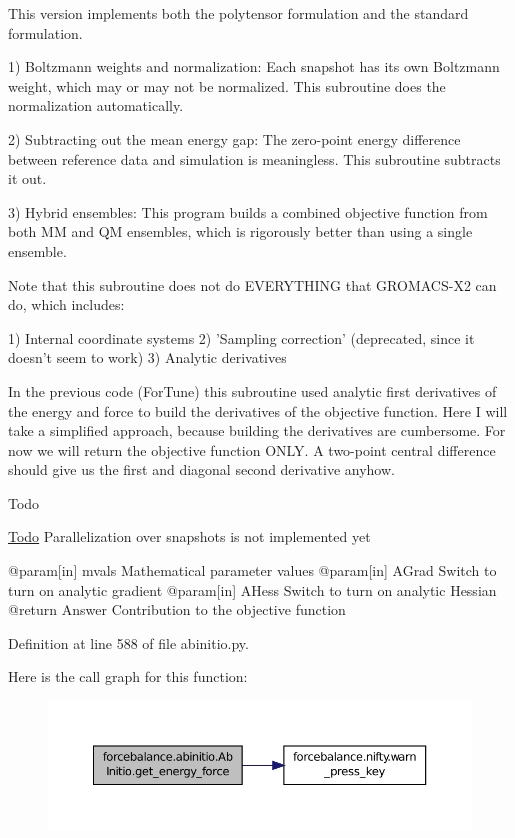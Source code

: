 This version implements both the polytensor formulation and the standard formulation.

1) Boltzmann weights and normalization\-: Each snapshot has its own Boltzmann weight, which may or may not be normalized. This subroutine does the normalization automatically.

2) Subtracting out the mean energy gap\-: The zero-\/point energy difference between reference data and simulation is meaningless. This subroutine subtracts it out.

3) Hybrid ensembles\-: This program builds a combined objective function from both M\-M and Q\-M ensembles, which is rigorously better than using a single ensemble.

Note that this subroutine does not do E\-V\-E\-R\-Y\-T\-H\-I\-N\-G that G\-R\-O\-M\-A\-C\-S-\/\-X2 can do, which includes\-:

1) Internal coordinate systems 2) 'Sampling correction' (deprecated, since it doesn't seem to work) 3) Analytic derivatives

In the previous code (For\-Tune) this subroutine used analytic first derivatives of the energy and force to build the derivatives of the objective function. Here I will take a simplified approach, because building the derivatives are cumbersome. For now we will return the objective function O\-N\-L\-Y. A two-\/point central difference should give us the first and diagonal second derivative anyhow.

\begin{DoxyRefDesc}{Todo}
\item[\hyperlink{todo__todo000005}{Todo}]Parallelization over snapshots is not implemented yet\end{DoxyRefDesc}
\begin{DoxyVerb}     @param[in] mvals Mathematical parameter values
     @param[in] AGrad Switch to turn on analytic gradient
     @param[in] AHess Switch to turn on analytic Hessian
     @return Answer Contribution to the objective function\end{DoxyVerb}
 

Definition at line 588 of file abinitio.\-py.



Here is the call graph for this function\-:
\nopagebreak
\begin{figure}[H]
\begin{center}
\leavevmode
\includegraphics[width=350pt]{classforcebalance_1_1abinitio_1_1AbInitio_ace85b4ad9266a96d16e39a4c6b440b7f_cgraph}
\end{center}
\end{figure}


